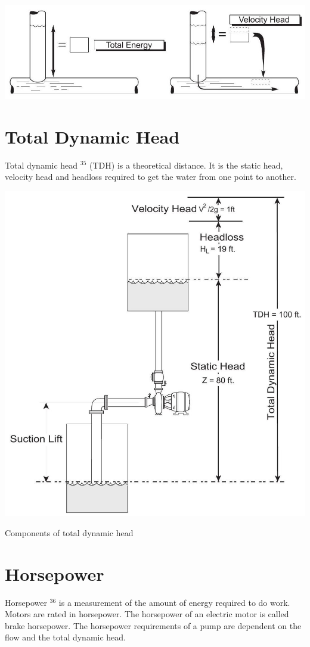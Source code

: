 \documentclass[10pt]{article}
\begin{document}
\includegraphics[max width=\textwidth]{2022_11_03_65aa625ded296bdfd01fg-20}

\section{Total Dynamic Head}
Total dynamic head ${ }^{35}$ (TDH) is a theoretical distance. It is the static head, velocity head and headloss required to get the water from one point to another.

\includegraphics[max width=\textwidth]{2022_11_03_65aa625ded296bdfd01fg-20(1)}

Components of total dynamic head

\section{Horsepower}
Horsepower ${ }^{36}$ is a measurement of the amount of energy required to do work. Motors are rated in horsepower. The horsepower of an electric motor is called brake horsepower. The horsepower requirements of a pump are dependent on the flow and the total dynamic head.
\end{document}
